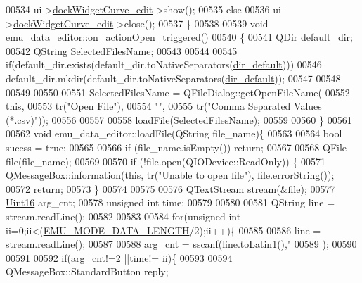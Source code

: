 \begin{DoxyCode}
00534          ui->\hyperlink{a00026_a83360bdd61e994537715aa7c38e4e5b6}{dockWidgetCurve\_edit}->show();
00535      \textcolor{keywordflow}{else}
00536          ui->\hyperlink{a00026_a83360bdd61e994537715aa7c38e4e5b6}{dockWidgetCurve\_edit}->close();
00537 \}
00538 
00539 \textcolor{keywordtype}{void} emu\_data\_editor::on\_actionOpen\_triggered()
00540 \{
00541     QDir   default\_dir;
00542     QString SelectedFilesName;
00543 
00544 
00545     \textcolor{keywordflow}{if}(default\_dir.exists(default\_dir.toNativeSeparators(\hyperlink{a00004_aa55b7d8008e31fcc971692b493e7cf34}{dir\_default})))
00546         default\_dir.mkdir(default\_dir.toNativeSeparators(\hyperlink{a00004_aa55b7d8008e31fcc971692b493e7cf34}{dir\_default}));
00547 
00548 
00549 
00550 
00551     SelectedFilesName = QFileDialog::getOpenFileName(
00552         \textcolor{keyword}{this},
00553         tr(\textcolor{stringliteral}{"Open File"}),
00554         \textcolor{stringliteral}{""},
00555         tr(\textcolor{stringliteral}{"Comma Separated Values (*.csv)"}));
00556 
00557 
00558      loadFile(SelectedFilesName);
00559 
00560 \}
00561 
00562 \textcolor{keywordtype}{void} emu\_data\_editor::loadFile(QString file\_name)\{
00563 
00564     \textcolor{keywordtype}{bool}   sucess = \textcolor{keyword}{true};
00565 
00566     \textcolor{keywordflow}{if} (file\_name.isEmpty()) \textcolor{keywordflow}{return};
00567 
00568         QFile file(file\_name);
00569 
00570         \textcolor{keywordflow}{if} (!file.open(QIODevice::ReadOnly)) \{
00571             QMessageBox::information(\textcolor{keyword}{this}, tr(\textcolor{stringliteral}{"Unable to open file"}), file.errorString());
00572             \textcolor{keywordflow}{return};
00573         \}
00574 
00575 
00576 QTextStream stream(&file);
00577 \hyperlink{a00001_aae7407b021d43f7193a81a58cfb3e297}{Uint16} arg\_cnt;
00578 \textcolor{keywordtype}{unsigned} \textcolor{keywordtype}{int} time;
00579 
00580 
00581        QString line = stream.readLine();
00582 
00583 
00584        \textcolor{keywordflow}{for}(\textcolor{keywordtype}{unsigned} \textcolor{keywordtype}{int} ii=0;ii<(\hyperlink{a00003_af4c3a8ad94feb4d7bda7f107f34baf41}{EMU\_MODE\_DATA\_LENGTH}/2);ii++)\{
00585 
00586              line = stream.readLine();
00587 
00588              arg\_cnt = sscanf(line.toLatin1(),\textcolor{stringliteral}{"%
00589                               );
00590 
00591 
00592              \textcolor{keywordflow}{if}(arg\_cnt!=2 ||time!= ii)\{
00593 
00594                  QMessageBox::StandardButton reply;
}
\end{DoxyCode}
